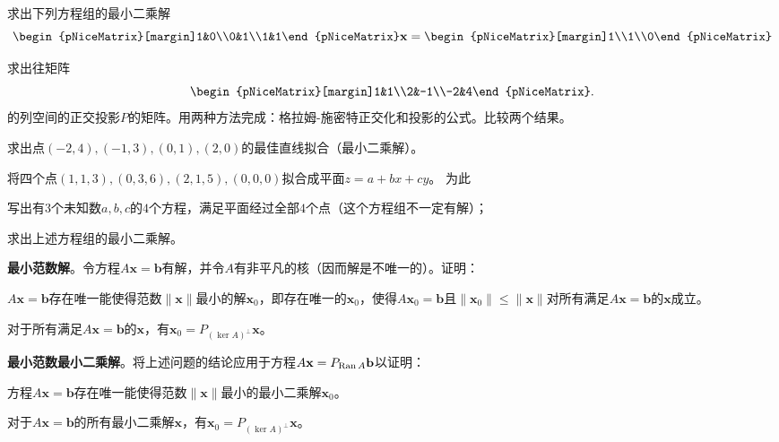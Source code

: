 \begin{problemset}
    \item 求出下列方程组的最小二乘解\[\begin{pNiceMatrix}[margin]1&0\\0&1\\1&1\end{pNiceMatrix}\mathbf{x}=\begin{pNiceMatrix}[margin]1\\1\\0\end{pNiceMatrix}\]
    \item 求出往矩阵\[\begin{pNiceMatrix}[margin]1&1\\2&-1\\-2&4\end{pNiceMatrix}.\]
    的列空间的正交投影$P$的矩阵。用两种方法完成：格拉姆-施密特正交化和投影的公式。比较两个结果。
    \item 求出点$(-2,4),(-1,3),(0,1),(2,0)$的最佳直线拟合（最小二乘解）。
    \item 将四个点$(1,1,3),(0,3,6),(2,1,5),(0,0,0)$拟合成平面$z=a+bx+cy$。
    为此
    \begin{probenumerate}
        \item 写出有$3$个未知数$a,b,c$的$4$个方程，满足平面经过全部$4$个点（这个方程组不一定有解）；
        \item 求出上述方程组的最小二乘解。
    \end{probenumerate}
    \item \label{ex:5_4_5}\textbf{最小范数解}。令方程$A\mathbf{x}=\mathbf{b}$有解，并令$A$有非平凡的核（因而解是不唯一的）。证明：
    \begin{probenumerate}
        \item $A\mathbf{x}=\mathbf{b}$存在唯一能使得范数$\|\mathbf{x}\|$最小的解$\mathbf{x}_0$，即存在唯一的$\mathbf{x}_0$，使得$A\mathbf{x}_0=\mathbf{b}$且$\|\mathbf{x}_0\|\le \|\mathbf{x}\|$对所有满足$A\mathbf{x}=\mathbf{b}$的$\mathbf{x}$成立。
        \item 对于所有满足$A\mathbf{x}=\mathbf{b}$的$\mathbf{x}$，有$\mathbf{x}_{0}=P_{(\ker A)^{\perp}}\mathbf{x}$。
    \end{probenumerate}
    \item \label{ex:5_4_6}\textbf{最小范数最小二乘解}。将上述问题的结论应用于方程$A\mathbf{x}=P_{\operatorname{Ran} A}\mathbf{b}$以证明：
    \begin{probenumerate}
        \item 方程$A\mathbf{x}=\mathbf{b}$存在唯一能使得范数$\|\mathbf{x}\|$最小的最小二乘解$\mathbf{x}_0$。
        \item 对于$A\mathbf{x}=\mathbf{b}$的所有最小二乘解$\mathbf{x}$，有$\mathbf{x}_{0}=P_{(\ker A)^{\perp}}\mathbf{x}$。
    \end{probenumerate}
\end{problemset}

